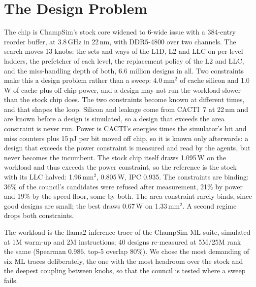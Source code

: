\documentclass[conference]{IEEEtran}
\begin{document}
\section{The Design Problem}\label{sec:problem}
The chip is ChampSim's \cite{champsim} stock core widened to 6-wide issue with a 384-entry
reorder buffer, at 3.8\,GHz in 22\,nm, with DDR5-4800 over two channels. %
The search moves 13 knobs: the sets and ways of the L1D, L2 and LLC on per-level ladders, the
prefetcher of each level, the replacement policy of the L2 and LLC, and the miss-handling depth of
both, 6.6 million designs in all. Two constraints make this a design problem rather than a sweep:
4.0\,mm$^2$ of cache silicon and 1.0\,W of cache plus off-chip power, and a design may not run
the workload slower than the stock chip does. The two constraints become known at
different times, and that shapes the loop. Silicon and leakage come from CACTI~7 \cite{cacti7} at
22\,nm and are known before a design is simulated, so a design that exceeds the area constraint is
never run. Power is CACTI's energies times the simulator's hit and miss counters plus 15\,pJ per
bit moved off chip, so it is known only afterwards: a design that exceeds the power constraint is
measured and read by the agents, but never becomes the incumbent. %
The stock chip itself draws 1.095\,W on the workload and thus exceeds the power constraint, so
the reference is the stock with its LLC halved: 1.96\,mm$^2$, 0.805\,W, IPC 0.935. The
constraints are binding: 36\% of the council's candidates were refused after measurement, 21\% by
power and 19\% by the speed floor, some by both. The area constraint rarely binds, since good
designs are small; the best draws 0.67\,W on 1.33\,mm$^2$. A second regime drops both
constraints. %

The workload is the llama2 inference trace of the ChampSim ML suite, simulated at 1M warm-up and
2M instructions; 40 designs re-measured at 5M/25M rank the same (Spearman 0.986, top-5 overlap
80\%). %
We chose the most demanding of six ML traces deliberately, the one with the most headroom over
the stock and the deepest coupling between knobs, so that the council is tested where a sweep
fails. %

\end{document}
